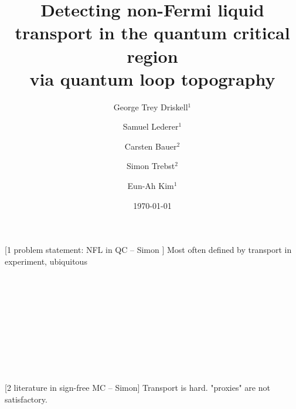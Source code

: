 \documentclass[amsmath,amssymb, aps, prx, longbibliography, twocolumn]{revtex4-1}
\begin{document}
\title{ Detecting non-Fermi liquid transport in the quantum critical region \\ via quantum loop topography}

\author{George Trey Driskell$^1$}
\author{Samuel Lederer$^1$}
\author{Carsten Bauer$^2$}
\author{Simon Trebst$^2$}
\author{Eun-Ah Kim$^1$}

%

\date{\today}

\begin{abstract}

\end{abstract}

\maketitle

[1 problem statement: NFL in QC -- Simon ]
Most often defined by transport in experiment, ubiquitous
\\
\\
\\
\\
\\
\\
\\
\\
\\
\\
\\


[2 literature in sign-free MC -- Simon]
Transport is hard. "proxies" are not satisfactory.
\\
\\
\\
\\
\\
\\
\\
\\
\\
\\
\\
\\
\\
\\
\\
\end{document}
